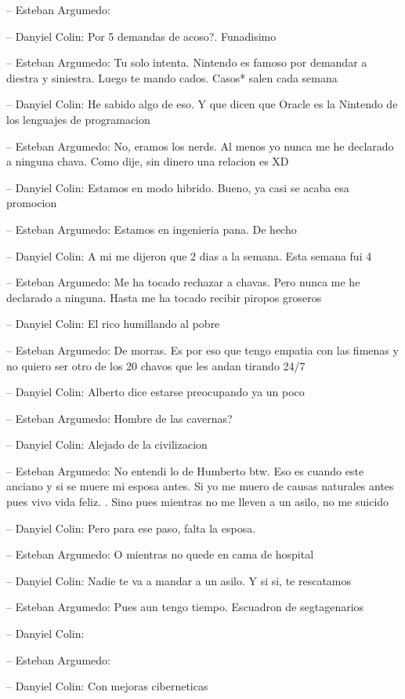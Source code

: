 -- Esteban Argumedo:

-- Danyiel Colin: Por 5 demandas de acoso?. Funadisimo

-- Esteban Argumedo: Tu solo intenta. Nintendo es famoso por demandar a
diestra y siniestra. Luego te mando cados. Casos* salen cada semana

-- Danyiel Colin: He sabido algo de eso. Y que dicen que Oracle es la
Nintendo de los lenguajes de programacion

-- Esteban Argumedo: No, eramos los nerds. Al menos yo nunca me he
declarado a ninguna chava. Como dije, sin dinero una relacion es XD

-- Danyiel Colin: Estamos en modo hibrido. Bueno, ya casi se acaba esa
promocion

-- Esteban Argumedo: Estamos en ingenieria pana. De hecho

-- Danyiel Colin: A mi me dijeron que 2 dias a la semana. Esta semana
fui 4

-- Esteban Argumedo: Me ha tocado rechazar a chavas. Pero nunca me he
declarado a ninguna. Hasta me ha tocado recibir piropos groseros

-- Danyiel Colin: El rico humillando al pobre

-- Esteban Argumedo: De morras. Es por eso que tengo empatia con las
fimenas y no quiero ser otro de los 20 chavos que les andan tirando 24/7

-- Danyiel Colin: Alberto dice estarse preocupando ya un poco

-- Esteban Argumedo: Hombre de las cavernas?

-- Danyiel Colin: Alejado de la civilizacion

-- Esteban Argumedo: No entendi lo de Humberto btw. Eso es cuando este
anciano y si se muere mi esposa antes. Si yo me muero de causas
naturales antes pues vivo vida feliz. . Sino pues mientras no me lleven
a un asilo, no me suicido

-- Danyiel Colin: Pero para ese paso, falta la esposa.

-- Esteban Argumedo: O mientras no quede en cama de hospital

-- Danyiel Colin: Nadie te va a mandar a un asilo. Y si si, te
rescatamos

-- Esteban Argumedo: Pues aun tengo tiempo. Escuadron de segtagenarios

-- Danyiel Colin:

-- Esteban Argumedo:

-- Danyiel Colin: Con mejoras ciberneticas

